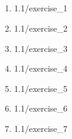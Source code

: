 \documentclass {article}
\renewcommand{\thesubsection}{}
\begin{document}
	\setcounter{section}{1}
	\renewcommand{\thesubsection}{Section \arabic{section}.\arabic{subsection}}
	\subsection{}
	\begin{enumerate}
		\item  {1.1/exercise_1}
		\item  {1.1/exercise_2}
		\item  {1.1/exercise_3}
		\item  {1.1/exercise_4}
		\item  {1.1/exercise_5}
		\item  {1.1/exercise_6}
		\item  {1.1/exercise_7}
	\end{enumerate}
	\renewcommand{\thesubsection}{}
\end{document}
